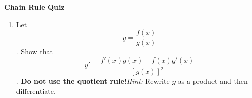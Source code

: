 \documentclass[11pt]{article}
\begin{document}

\centerline{\textbf{\Large{Chain Rule Quiz}}}

\vspace{0.2in}
 

\begin{enumerate}

\item Let \[y = \frac{f(x)}{g(x)}\]. Show that \[y' = \frac{f'(x) g(x) - f(x) g'(x)}{[g(x)]^2}\]. \textbf{Do not use the quotient rule!}\textit{Hint:} Rewrite $y$ as a product and then differentiate. 

\end{enumerate}
 
\end{document}
